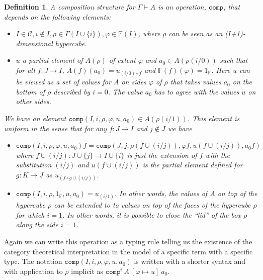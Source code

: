 \documentclass[12pt,a4paper,twoside,xetex]{book}
\newcommand{\keyword}[1]{\emph{#1}\index{#1}}
\newtheorem{definition}[theorem]{Definition}
\newcommand{\op}[1]{\mathtt{#1}}
\newcommand{\compt}[5]{\op{comp}^{#1} \ {#2} \ \left[{#3} \mapsto {#4} \right] \ {#5}}
\begin{document}
\begin{definition}\label{compdef}
A \keyword{composition structure} for $\Gamma \vdash A$ is an operation, $\op{comp}$, that depends on the following elements:

\begin{itemize}
\item $I \in \mathcal{C}, i \not \in I, \rho \in \Gamma(I \cup \{i\}), \varphi \in \mathbb{F}(I)$, where $\rho$ can be seen as an ($I$+1)-dimensional hypercube.
\item $u$ a partial element of $A(\rho)$ of extent $\varphi$ and $a_0 \in A(\rho (i/0))$ such that for all $f:J\rightarrow I$, $A(f)(a_0) = u _{(i/0) \circ f}$ and $\mathbb{F}(f)(\varphi) = 1_{\mathbb{F}}$. Here $u$ can be viewed as a set of values for $A$ on sides $\varphi$ of $\rho$ that takes values $a_0$ on the bottom of $\rho$ described by $i=0$. The value $a_0$ has to agree with the values $u$ on other sides.
\end{itemize}

We have an element $\op{comp}(I,i,\rho,\varphi, u,a_0)\in A(\rho(i/1))$. This element is uniform in the sense that for any $f:J \rightarrow I$ and $j \not \in J$ we have 

\begin{itemize}
\item $\op{comp} \left(I,i,\rho,\varphi, u , a_0 \right) f = \op{comp}(J,j,\rho(f \cup (i/j)), \varphi f, u(f \cup (i/j)), a_0 f)$  where $f \cup (i/j): J \cup \{j\} \rightarrow I \cup \{i\}$ is just the extension of $f$ with the substitution $(i/j)$ and $u(f \cup (i/j))$ is the partial element defined for $g: K \rightarrow J$ as $u_{(f \circ g \cup (i/j))}$.

\item $\op{comp}(I,i,\rho, 1_{\mathbb{F}}, u, a_0) = u_{(i/1)}$. In other words, the values of $A$ on top of the hypercube $\rho$ can be extended to to values on top of the faces of the hypercube $\rho$ for which $i=1$. In other words, it is possible to close the ``lid'' of the box $\rho$ along the side $i=1$.

\end{itemize}



\end{definition}



Again we can write this operation as a typing rule telling us the existence of the category theoretical interpretation in the model of a specific term with a specific type. The notation $\op{comp}(I,i,\rho, \varphi, u, a_0)$ is written with a shorter syntax and with application to $\rho$ implicit as $\compt{i}{A}{\varphi}{u}{a_0}$.
\end{document}
